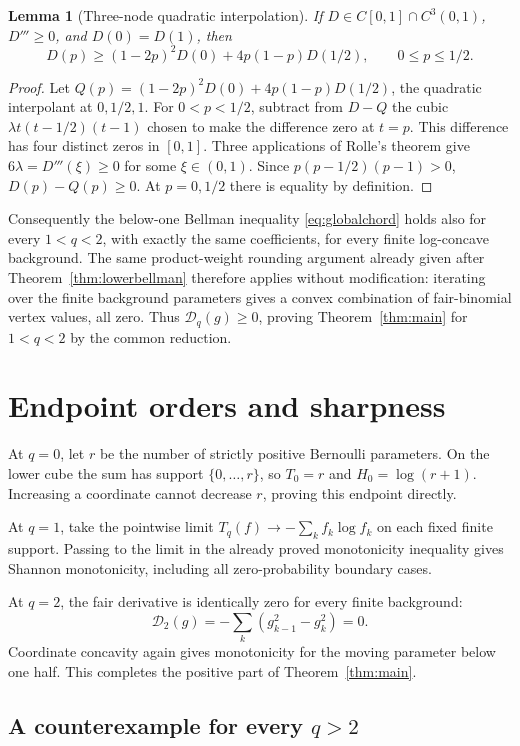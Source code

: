 \documentclass[11pt,a4paper]{amsart}
\numberwithin{equation}{section}
\newtheorem{lemma}[theorem]{Lemma}
\theoremstyle{remark}
\newcommand{\D}{\mathscr D}
\begin{document}
\begin{lemma}[Three-node quadratic interpolation]
\label{lem:quadraticbridge}
If $D\in C[0,1]\cap C^3(0,1)$, $D'''\ge0$, and $D(0)=D(1)$, then
\[
D(p)\ge (1-2p)^2D(0)+4p(1-p)D(1/2),\qquad0\le p\le1/2.
\]
\end{lemma}
\begin{proof}
Let $Q(p)=(1-2p)^2D(0)+4p(1-p)D(1/2)$, the quadratic
interpolant at $0,1/2,1$. For $0<p<1/2$, subtract from $D-Q$ the
cubic $\lambda t(t-1/2)(t-1)$ chosen to make the difference zero
at $t=p$. This difference has four distinct zeros in $[0,1]$.
Three applications of Rolle's theorem give
$6\lambda=D'''(\xi)\ge0$ for some $\xi\in(0,1)$.
Since $p(p-1/2)(p-1)>0$, $D(p)-Q(p)\ge0$.
At $p=0,1/2$ there is equality by definition.
\end{proof}

Consequently the below-one Bellman inequality \eqref{eq:globalchord}
holds also for every $1<q<2$, with exactly the same coefficients,
for every finite log-concave background. The same product-weight
rounding argument already given after Theorem~\ref{thm:lowerbellman}
therefore applies without modification: iterating over the finite
background parameters gives a convex combination of fair-binomial
vertex values, all zero. Thus $\D_q(g)\ge0$, proving
Theorem~\ref{thm:main} for $1<q<2$ by the common reduction.

\section{Endpoint orders and sharpness}
\label{sec:scope}

At $q=0$, let $r$ be the number of strictly positive Bernoulli
parameters. On the lower cube the sum has support $\{0,\ldots,r\}$,
so $T_0=r$ and $H_0=\log(r+1)$. Increasing a coordinate cannot decrease
$r$, proving this endpoint directly.

At $q=1$, take the pointwise limit $T_q(f)\to-\sum_k f_k\log f_k$ on
each fixed finite support. Passing to the limit in the already proved
monotonicity inequality gives Shannon monotonicity, including all
zero-probability boundary cases.

At $q=2$, the fair derivative is identically zero for every finite
background:
\[
\D_2(g)=-\sum_k(g_{k-1}^2-g_k^2)=0.
\]
Coordinate concavity again gives monotonicity for the moving parameter
below one half. This completes the positive part of
Theorem~\ref{thm:main}.

\subsection{A counterexample for every \texorpdfstring{$q>2$}{q greater than two}}
\end{document}

